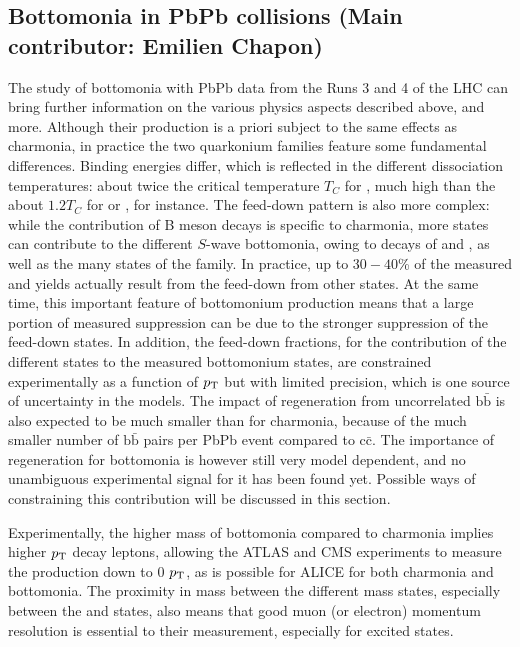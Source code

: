 \documentclass[../report.tex]{subfiles}
\begin{document}
\clearpage

\subsection{Bottomonia in PbPb collisions (Main contributor: Emilien Chapon)}


The study of bottomonia with PbPb data from the Runs 3 and 4 of the LHC can bring further information on the various physics aspects described above, and more.
Although their production is a priori subject to the same effects as charmonia, in practice the two quarkonium families feature some fundamental differences.
Binding energies differ, which is reflected in the different dissociation temperatures: about twice the critical temperature $T_C$ for , much high than the about
$1.2 T_C$ for \PJgy or , for instance. The feed-down pattern is also more complex: while the contribution of B meson decays is specific to charmonia, more states can
contribute to the different $S$-wave bottomonia, owing to decays of  and , as well as the many states of the \PGcb family. In practice, up to $30-40$\% of the measured 
 and  yields actually result from the feed-down from other states. At the same time, this important feature of bottomonium production means that
a large portion of measured  suppression can be due to the stronger suppression of the feed-down states.
In addition, the feed-down fractions, for the contribution of the 
different states to the measured bottomonium states, are constrained experimentally as a function of $p_{\rm T}$ but with limited precision, which is one source of uncertainty in the models.
The impact of regeneration from uncorrelated $\text{b}\bar{\text{b}}$ is also expected to be much smaller than for charmonia, because of the much smaller number of $\text{b}\bar{\text{b}}$
pairs per PbPb event compared to $\text{c}\bar{\text{c}}$. The importance of regeneration for bottomonia is however still very model dependent, and no unambiguous experimental signal
for it has been found yet. Possible ways of constraining this contribution will be discussed in this section.

Experimentally, the higher mass of bottomonia compared to charmonia implies higher $p_{\rm T}$ decay leptons, allowing the ATLAS and CMS experiments to measure the production down to 0 $p_{\rm T}$,
as is possible for ALICE for both charmonia and bottomonia. The proximity in mass between the different mass states, especially between the  and  states, also 
means that good muon (or electron) momentum resolution is essential to their measurement, especially for excited states. 
\end{document}

